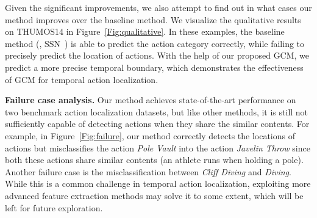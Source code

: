 \documentclass[10pt,journal,compsoc]{IEEEtran}
\begin{document}
	Given the significant improvements, we also attempt to find out in what cases our method improves over the baseline method. We visualize the qualitative results on THUMOS14 in Figure~\ref{Fig:qualitative}. In these examples, the baseline method (\ie, SSN~\cite{zhao2017temporal})
	is able to predict the action category correctly, while failing to precisely predict the location of actions. With the help of our proposed GCM, we predict a more precise temporal boundary, which demonstrates the effectiveness of GCM for temporal action localization. 
	
	\noindent \textbf{Failure case analysis.} 
	Our method achieves state-of-the-art performance on
    two benchmark action localization datasets, but like other methods, it is still not sufficiently capable of detecting actions when they share the similar contents.
    For example, in Figure~\ref{Fig:failure}, our method correctly detects the locations of actions but misclassifies the action \emph{Pole Vault} into the action \emph{Javelin Throw} since both these actions share similar contents (\ie an athlete runs when holding a pole). Another failure case is the misclassification between \emph{Cliff Diving} and \emph{Diving}. While this is a common challenge in temporal action localization, exploiting more advanced feature extraction methods may solve it to some extent, which will be left for future exploration.
    
	
	
	
	
\end{document}
